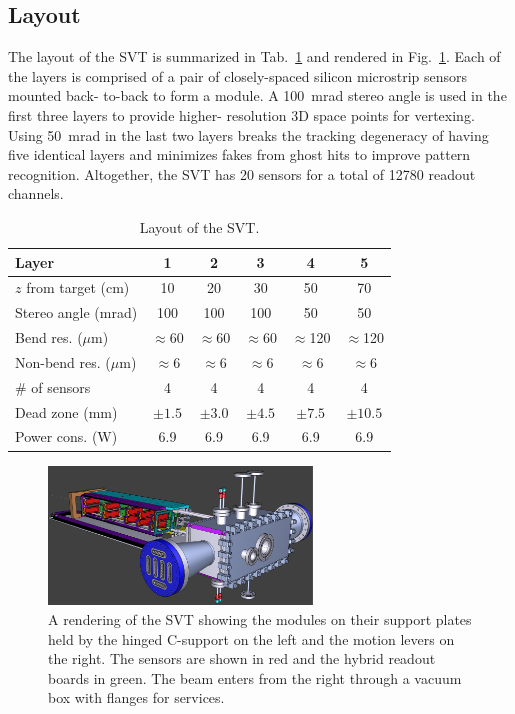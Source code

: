 \documentclass[final,3p,times,twocolumn]{elsarticle}
\begin{document}
\subsection{Layout}
The layout of the SVT is summarized in Tab.~\ref{tab:trk} and rendered in Fig.~\ref{fig:tracker_model}. 
Each of the layers is comprised of a pair of closely-spaced silicon microstrip sensors mounted back-
to-back to form a module. A 100~mrad stereo angle is used in the first three layers to provide higher-
resolution 3D space points for vertexing.  Using 50~mrad in the last two layers breaks the tracking 
degeneracy of having five identical layers and minimizes fakes from ghost hits to improve pattern 
recognition. Altogether, the SVT has 20 sensors for a total of 12780 readout channels. 
\begin{center}
\begin{table}[ht]
{\footnotesize
\begin{tabular}{lccccc}   
\hline \hline 
    Layer & 1 & 2 & 3 & 4 & 5 \\      
\hline
    $z$ from target (cm)  & 10 & 20 & 30 & 50 & 70  \\ 
    Stereo angle (mrad)  & 100 & 100 & 100 & 50 & 50 \\ 
    Bend res. ($\mu$m)  & $\approx$60 & $\approx$60 & $\approx$60 & $\approx$120 & $\approx$120  \\ 
    Non-bend res. ($\mu$m)  & $\approx$6 & $\approx$6 & $\approx$6 & $\approx$6 & $\approx$6  \\ 
    \# of sensors  & 4 & 4 & 4 & 4 & 4  \\ 
    Dead zone (mm) & $\pm1.5$  & $\pm3.0$  & $\pm4.5$  & $\pm7.5$  & $\pm10.5$  \\ 
    Power cons. (W) & 6.9 & 6.9 & 6.9 & 6.9 & 6.9 \\
\hline \hline
\end{tabular}
\caption{\small Layout of the SVT.}
}
\label{tab:trk}
\vspace*{-15mm}
\end{table}
\end{center}
\begin{center}
\begin{figure}[htp]
\includegraphics[width=7cm]{figures/HPS_nochamber}
\caption{\small A rendering of the SVT showing the modules on their support plates held by the 
hinged C-support on the left and the motion levers on the right. The sensors are shown in red and the 
hybrid readout boards in green. The beam enters from the right through a vacuum box with flanges 
for services. }
\label{fig:tracker_model}
\end{figure}
\end{center}
\end{document}
